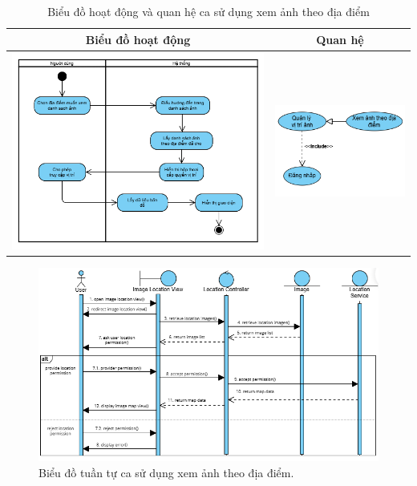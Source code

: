 \noindent 
\begin{table}[H]
\centering
\caption{Biểu đồ hoạt động và quan hệ ca sử dụng xem ảnh theo địa điểm}
\label{tab:view-image-location-usecase-activity}
\begin{tabular}{| c | c |}
    \hline
    \textbf{Biểu đồ hoạt động} & \textbf{Quan hệ} \\ 
    \hline
    \includegraphics[width=0.6\linewidth]{figures/c3/3-3-14-activity-diagram.png} 
    &  
    \includegraphics[width=0.35\linewidth]{figures/c3/3-3-14-relationship.png} \\ 
    \hline
\end{tabular}
\end{table}

\begin{figure}[H]
    \centering  
    \includegraphics[width=1\textwidth]{figures/c3/3-3-14-sequence-diagram.png}
    \caption{Biểu đồ tuần tự ca sử dụng xem ảnh theo địa điểm.}
    \label{fig:3-3-14-sequence-diagram}
\end{figure}